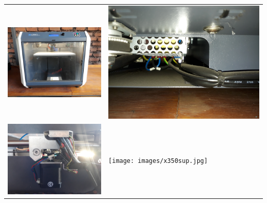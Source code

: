\begin{table}[H]
\centering
\begin{tabular}{p{6cm}p{6cm}}
\includegraphics[scale=0.04]{images/x350front.jpg} & \includegraphics[scale=0.04]{images/x350inf.jpg}\\
\includegraphics[scale=0.04]{images/x350lat.jpg} & \texttt{[image: images/x350sup.jpg]}\\

\end{tabular}
\end{table}
